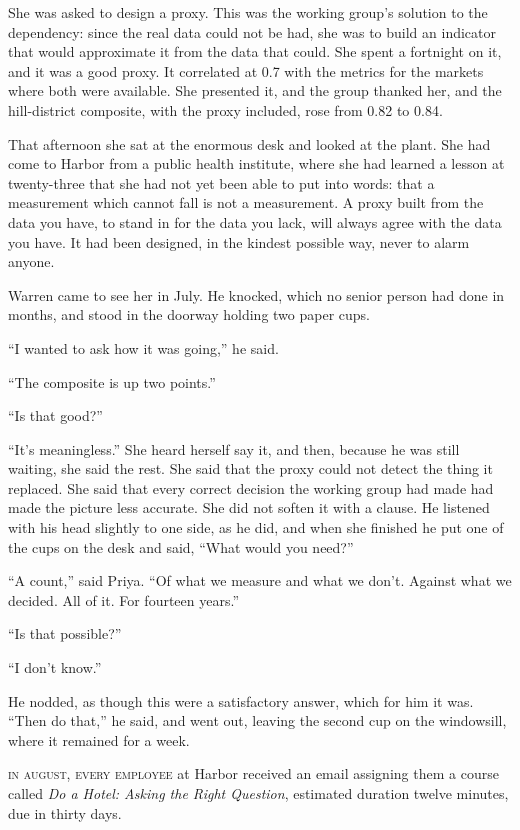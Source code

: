 She was asked to design a proxy. This was the working group's solution to the dependency: since the real data could not be had, she was to build an indicator that would approximate it from the data that could. She spent a fortnight on it, and it was a good proxy. It correlated at 0.7 with the metrics for the markets where both were available. She presented it, and the group thanked her, and the hill-district composite, with the proxy included, rose from 0.82 to 0.84.

That afternoon she sat at the enormous desk and looked at the plant. She had come to Harbor from a public health institute, where she had learned a lesson at twenty-three that she had not yet been able to put into words: that a measurement which cannot fall is not a measurement. A proxy built from the data you have, to stand in for the data you lack, will always agree with the data you have. It had been designed, in the kindest possible way, never to alarm anyone.

Warren came to see her in July. He knocked, which no senior person had done in months, and stood in the doorway holding two paper cups.

``I wanted to ask how it was going,'' he said.

``The composite is up two points.''

``Is that good?''

``It's meaningless.'' She heard herself say it, and then, because he was still waiting, she said the rest. She said that the proxy could not detect the thing it replaced. She said that every correct decision the working group had made had made the picture less accurate. She did not soften it with a clause. He listened with his head slightly to one side, as he did, and when she finished he put one of the cups on the desk and said, ``What would you need?''

``A count,'' said Priya. ``Of what we measure and what we don't. Against what we decided. All of it. For fourteen years.''

``Is that possible?''

``I don't know.''

He nodded, as though this were a satisfactory answer, which for him it was. ``Then do that,'' he said, and went out, leaving the second cup on the windowsill, where it remained for a week.


\textsc{in august, every employee} at Harbor received an email assigning them a course called \emph{Do a Hotel: Asking the Right Question}, estimated duration twelve minutes, due in thirty days.


